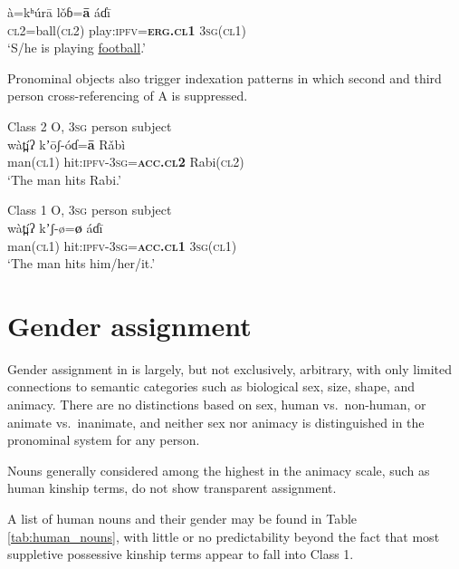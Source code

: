 \documentclass[output=collectionpaper,hidelinks]{langscibook}
\theoremstyle{remark}
\begin{document}
\ea
\gll  à=kʰúrā lǒɓ=\textbf{ā} áɗī \\
 \textsc{cl2}=ball(\textsc{cl2}) play:\textsc{ipfv}=\textbf{\textsc{erg.cl1}} \textsc{3sg}(\textsc{cl1}) \\
\glt `S/he is playing \uline{football}.' \\
\z


Pronominal objects also trigger indexation patterns in which second and third person
cross-referencing of A is suppressed.

\ea
 Class 2 O, \textsc{3sg} person subject \\
\gll wàt̪íʔ kʼōʃ-óɗ=\textbf{ā} Rǎbì \\
 man(\textsc{cl1}) hit:\textsc{ipfv}-\textsc{3sg}=\textbf{\textsc{acc.cl2}} Rabi(\textsc{cl2}) \\
\glt `The man hits Rabi.' \\
\z

\ea
 Class 1 O, \textsc{3sg} person subject \\
\gll wàt̪íʔ kʼ\oMidHigh{}\hspace*{-0.4mm}ʃ-ø=\textbf{ø} áɗī \\
 man(\textsc{cl1}) hit:\textsc{ipfv}-\textsc{3sg}=\textbf{\textsc{acc.cl1}} \textsc{3sg}(\textsc{cl1}) \\
\glt `The man hits him/her/it.' \\
\z


\section{Gender assignment}
\label{sec:Assignment}

Gender assignment in  is largely, but not exclusively, arbitrary, with only
limited connections to semantic categories such as biological sex, size, shape,
and animacy. There are no distinctions based on sex, human vs.\ non-human, or
animate vs.\ inanimate, and neither sex nor animacy is distinguished in the
pronominal system for any person.

Nouns generally considered among the highest in the animacy scale, such as human
kinship terms, do not show transparent assignment.

A list of human nouns and their gender may be found in Table
\ref{tab:human_nouns}, with little or no predictability beyond the fact that
most suppletive possessive kinship terms appear to fall into Class 1.
\end{document}
